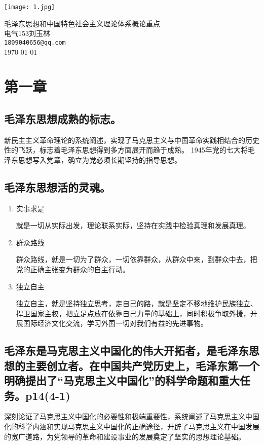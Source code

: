 \documentclass[UTF8]{ctexart}
\begin{document}
    \begin{titlepage}
    \centering
    \centerline{\texttt{[image: 1.jpg]}}
    {\sffamily\fontsize{20}{29} 毛泽东思想和中国特色社会主义理论体系概论重点}\\
    {\Large {\fangsong 电气153刘玉林}\\[5pt]\texttt{1809040656@qq.com}}\\
    {\today}
    \end{titlepage}
\tableofcontents\thispagestyle{empty}
\newpage 
\setcounter{page}{1}
\section{第一章}
\subsection{毛泽东思想成熟的标志。}
新民主主义革命理论的系统阐述，实现了马克思主义与中国革命实践相结合的历史性的飞跃，标志着毛泽东思想得到多方面展开而趋于成熟。
1945年党的七大将毛泽东思想写入党章，确立为党必须长期坚持的指导思想。
\subsection{毛泽东思想活的灵魂。}
\begin{enumerate}[(1)]
\item 实事求是
\par 就是一切从实际出发，理论联系实际，坚持在实践中检验真理和发展真理。
\item 群众路线 
\par 群众路线，就是一切为了群众，一切依靠群众，从群众中来，到群众中去，把党的正确主张变为群众的自主行动。
\item 独立自主
\par 独立自主，就是坚持独立思考，走自己的路，就是坚定不移地维护民族独立、捍卫国家主权，把立足点放在依靠自己力量的基础上，同时积极争取外援，开展国际经济文化交流，学习外国一切对我们有益的先进事物。
\end{enumerate}
\subsection{毛泽东是马克思主义中国化的伟大开拓者，是毛泽东思想的主要创立者。在中国共产党历史上，毛泽东第一个明确提出了“马克思主义中国化”的科学命题和重大任务。p14(4-1)}
\par 深刻论证了马克思主义中国化的必要性和极端重要性，系统阐述了马克思主义中国化的科学内涵和实现马克思主义中国化的正确途径，开辟了马克思主义在中国发展的宽广道路，为党领导的革命和建设事业的发展奠定了坚实的思想理论基础。
\end{document}
